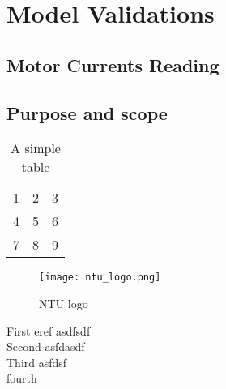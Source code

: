 \chapter{Model Validations}
\section{Motor Currents Reading}
\section{Purpose and scope }


\begin{table}[h!]
  \begin{center}
    \begin{tabular}{| l c r |}
    \hline
    1 & 2 & 3 \\
    4 & 5 & 6 \\
    7 & 8 & 9 \\
    \hline
    \end{tabular}
  \end{center}
  \caption{A simple table}
\end{table}

\begin{figure}[h!]  
  \centering
    \texttt{[image: ntu\_logo.png]}
  \caption{NTU logo}
\end{figure}


First eref \cite{Hao14} asdfsdf \\

Second \cite{Beyl11} asfdasdf \\

Third \cite{Bona05} asfdsf\\

fourth \cite{Ohi91} \\
